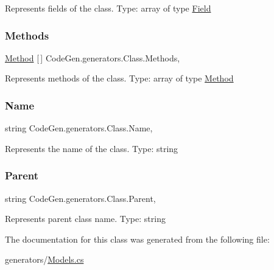 Represents fields of the class. Type\+: array of type \mbox{\hyperlink{classCodeGen_1_1generators_1_1Field}{Field}} 

\mbox{\label{classCodeGen_1_1generators_1_1Class_a96293c19a6d972cb1aa79200dcd20f8f}} 
\subsubsection{\texorpdfstring{Methods}{Methods}}
{\footnotesize\ttfamily \mbox{\hyperlink{classCodeGen_1_1generators_1_1Method}{Method}} \mbox{[}$\,$\mbox{]} Code\+Gen.\+generators.\+Class.\+Methods\hspace{0.3cm}{\ttfamily [get]}, {\ttfamily [set]}}



Represents methods of the class. Type\+: array of type \mbox{\hyperlink{classCodeGen_1_1generators_1_1Method}{Method}} 

\mbox{\label{classCodeGen_1_1generators_1_1Class_a4b4e4edea7c310e412795773ab3bc4ce}} 
\subsubsection{\texorpdfstring{Name}{Name}}
{\footnotesize\ttfamily string Code\+Gen.\+generators.\+Class.\+Name\hspace{0.3cm}{\ttfamily [get]}, {\ttfamily [set]}}



Represents the name of the class. Type\+: string 

\mbox{\label{classCodeGen_1_1generators_1_1Class_a930c3a9625829896ec1201e282f3fda1}} 
\subsubsection{\texorpdfstring{Parent}{Parent}}
{\footnotesize\ttfamily string Code\+Gen.\+generators.\+Class.\+Parent\hspace{0.3cm}{\ttfamily [get]}, {\ttfamily [set]}}



Represents parent class name. Type\+: string 



The documentation for this class was generated from the following file\+:\begin{DoxyCompactItemize}
\item 
generators/\mbox{\hyperlink{Models_8cs}{Models.\+cs}}\end{DoxyCompactItemize}
